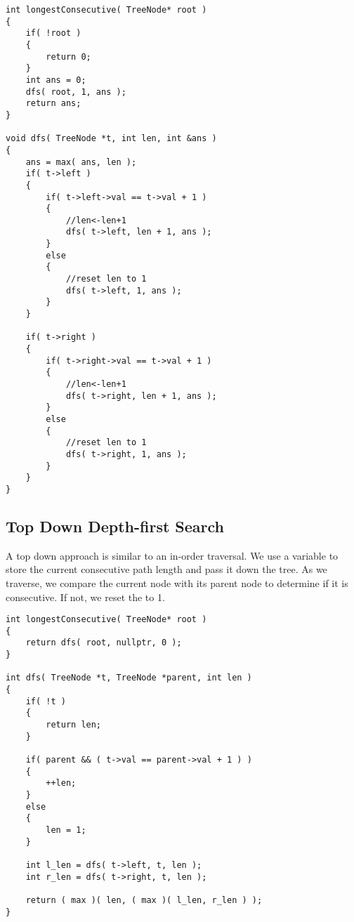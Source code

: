 \setcounter{lstlisting}{0}
\begin{lstlisting}[style=customc, caption={DFS}]
int longestConsecutive( TreeNode* root )
{
    if( !root )
    {
        return 0;
    }
    int ans = 0;
    dfs( root, 1, ans );
    return ans;
}

void dfs( TreeNode *t, int len, int &ans )
{
    ans = max( ans, len );
    if( t->left )
    {
        if( t->left->val == t->val + 1 )
        {
			//len<-len+1
            dfs( t->left, len + 1, ans );
        }
        else
        {
			//reset len to 1
            dfs( t->left, 1, ans );
        }
    }

    if( t->right )
    {
        if( t->right->val == t->val + 1 )
        {
            //len<-len+1
            dfs( t->right, len + 1, ans );
        }
        else
        {
            //reset len to 1
            dfs( t->right, 1, ans );
        }
    }
}

\end{lstlisting}
\subsection{Top Down Depth-first Search}
A top down approach is similar to an in-order traversal. We use a variable  to store the current consecutive path length and pass it down the tree. As we traverse, we compare the current node with its parent node to determine if it is consecutive. If not, we reset the  to 1.
\begin{lstlisting}[style=customc, caption={DFS 2}]
int longestConsecutive( TreeNode* root )
{
    return dfs( root, nullptr, 0 );
}

int dfs( TreeNode *t, TreeNode *parent, int len )
{
    if( !t )
    {
        return len;
    }

    if( parent && ( t->val == parent->val + 1 ) )
    {
        ++len;
    }
    else
    {
        len = 1;
    }

    int l_len = dfs( t->left, t, len );
    int r_len = dfs( t->right, t, len );

    return ( max )( len, ( max )( l_len, r_len ) );
}
\end{lstlisting}